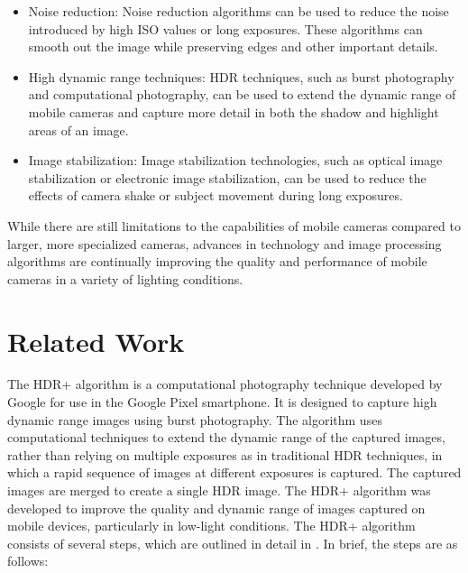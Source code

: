 \documentclass{egpubl}
\begin{document}
\begin{itemize}
    \item Noise reduction: Noise reduction algorithms can be used to reduce the noise 
          introduced by high ISO values or long exposures. These algorithms can smooth 
          out the image while preserving edges and other important details.

    \item High dynamic range techniques: HDR techniques, such as burst photography 
          and computational photography, can be used to extend the dynamic range of mobile 
          cameras and capture more detail in both the shadow and highlight areas of an image.
    
    \item Image stabilization: Image stabilization technologies, such as optical image 
          stabilization or electronic image stabilization, can be used to reduce the 
          effects of camera shake or subject movement during long exposures.
\end{itemize}
    
While there are still limitations to the capabilities of mobile cameras compared to larger, 
more specialized cameras, advances in technology and image processing algorithms are 
continually improving the quality and performance of mobile cameras in a variety of 
lighting conditions.


\section{Related Work}
\label{sec:related_work}

The HDR+ algorithm is a computational photography technique developed by Google for use 
in the Google Pixel smartphone. It is designed to capture high dynamic range images using 
burst photography. The algorithm uses computational techniques to extend the dynamic range 
of the captured images, rather than relying on multiple exposures as in traditional 
HDR techniques, in which a rapid sequence of images at different exposures is captured.
The captured images are merged to create a single HDR image. The HDR+ algorithm was developed 
to improve the quality and dynamic range of images captured on mobile devices, particularly in 
low-light conditions. The HDR+ algorithm consists of several steps, which are outlined in detail 
in \cite{Hasinoff2016burst}. In brief, the steps are as follows:
\end{document}
